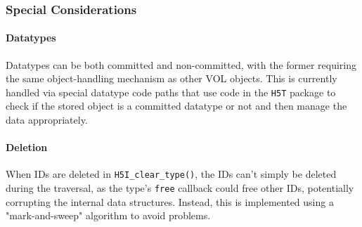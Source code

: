 \subsubsection{Special Considerations}

\paragraph{Datatypes}

Datatypes can be both committed and non-committed, with the former requiring the same object-handling mechanism as other VOL objects. This is currently handled via special datatype code paths that use code in the \texttt{H5T} package to check if the stored object is a committed datatype or not and then manage the data appropriately.

\paragraph{Deletion}

When IDs are deleted in \texttt{H5I\_clear\_type()}, the IDs can't simply be deleted during the traversal, as the type's \texttt{free} callback could free other IDs, potentially corrupting the internal data structures. Instead, this is implemented using a "mark-and-sweep" algorithm to avoid problems.

